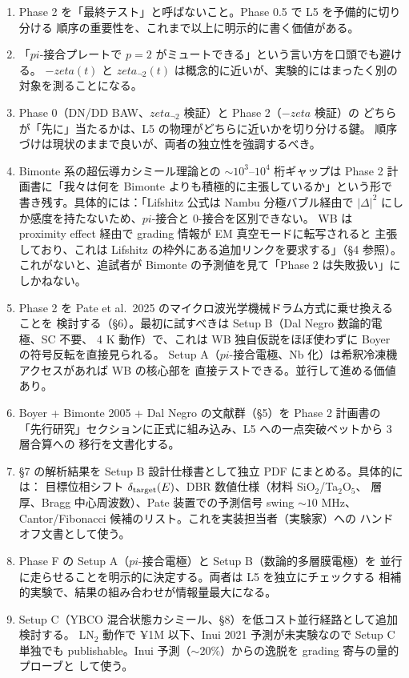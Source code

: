 \documentclass[11pt,a4paper]{article}
\def\pi{pi}%
\def\zeta{zeta}%
\def\textbf#1{#1}%
\begin{document}
\begin{enumerate}
\item Phase 2 を「最終テスト」と呼ばないこと。Phase 0.5 で L5 を予備的に切り分ける
  順序の重要性を、これまで以上に明示的に書く価値がある。
\item 「$\pi$-接合プレートで $p=2$ がミュートできる」という言い方を口頭でも避ける。
  $-\zeta(t)$ と $\zeta_{\neg 2}(t)$ は概念的に近いが、実験的にはまったく別の
  対象を測ることになる。
\item Phase 0（DN/DD BAW、$\zeta_{\neg 2}$ 検証）と Phase 2（$-\zeta$ 検証）の
  どちらが「先に」当たるかは、L5 の物理がどちらに近いかを切り分ける鍵。
  順序づけは現状のままで良いが、両者の独立性を強調するべき。
\item Bimonte 系の超伝導カシミール理論との $\sim 10^3$--$10^4$ 桁ギャップは
  Phase 2 計画書に「我々は何を Bimonte よりも積極的に主張しているか」という形で
  書き残す。具体的には：「Lifshitz 公式は Nambu 分極バブル経由で
  $|\Delta|^2$ にしか感度を持たないため、$\pi$-接合と 0-接合を区別できない。
  WB は proximity effect 経由で grading 情報が EM 真空モードに転写されると
  主張しており、これは Lifshitz の枠外にある追加リンクを要求する」（§4 参照）。
  これがないと、追試者が Bimonte の予測値を見て「Phase 2 は失敗扱い」にしかねない。
\item Phase 2 を Pate et al.\ 2025 のマイクロ波光学機械ドラム方式に乗せ換えることを
  検討する（§6）。最初に試すべきは Setup B（Dal Negro 数論的電極、SC 不要、
  4 K 動作）で、これは WB 独自仮説をほぼ使わずに Boyer の符号反転を直接見られる。
  Setup A（$\pi$-接合電極、Nb 化）は希釈冷凍機アクセスがあれば WB の核心部を
  直接テストできる。並行して進める価値あり。
\item Boyer + Bimonte 2005 + Dal Negro の文献群（§5）を Phase 2 計画書の
  「先行研究」セクションに正式に組み込み、L5 への一点突破ベットから 3 層合算への
  移行を文書化する。
\item §7 の解析結果を Setup B 設計仕様書として独立 PDF にまとめる。具体的には：
  目標位相シフト $\delta_{\rm target}(E)$、DBR 数値仕様（材料 SiO$_2$/Ta$_2$O$_5$、
  層厚、Bragg 中心周波数）、Pate 装置での予測信号 swing $\sim 10$ MHz、
  Cantor/Fibonacci 候補のリスト。これを実装担当者（実験家）への
  ハンドオフ文書として使う。
\item Phase F の Setup A（$\pi$-接合電極）と Setup B（数論的多層膜電極）を
  \textbf{並行に走らせる}ことを明示的に決定する。両者は L5 を独立にチェックする
  相補的実験で、結果の組み合わせが情報量最大になる。
\item Setup C（YBCO 混合状態カシミール、§8）を低コスト並行経路として追加検討する。
  LN$_2$ 動作で ¥1M 以下、Inui 2021 予測が未実験なので Setup C 単独でも
  publishable。Inui 予測（$\sim 20\%$）からの逸脱を grading 寄与の量的プローブと
  して使う。
\end{enumerate}
\end{document}
